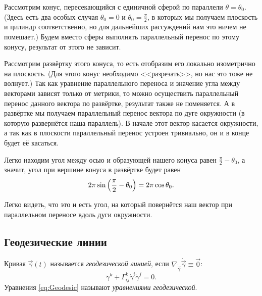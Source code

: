 \begin{secondsolution}
	Рассмотрим конус, пересекающийся с единичной сферой по параллели $\theta = \theta_0$. (Здесь есть два особых случая $\theta_0 = 0$ и $\theta_0 = \frac{\pi}{2}$, в которых мы получаем плоскость и цилиндр соответственно, но для дальнейших рассуждений нам это ничем не помешает.) Будем вместо сферы выполнять параллельный перенос по этому конусу, результат от этого не зависит.

	Рассмотрим развёртку этого конуса, то есть отобразим его локально изометрично на плоскость. (Для этого конус необходимо <<разрезать>>, но нас это тоже не волнует.) Так как уравнение параллельного переноса и значение угла между векторами зависят только от метрики, то можно осуществить параллельный перенос данного вектора по развёртке, результат также не поменяется. А в развёртке мы получаем параллельный перенос вектора по дуге окружности (в которую развернётся наша параллель). В начале этот вектор касается окружности, а так как в плоскости параллельный перенос устроен тривиально, он и в конце будет её касаться.

	Легко находим угол между осью и образующей нашего конуса равен $\frac{\pi}{2} - \theta_0$, а значит, угол при вершине конуса в развёртке будет равен
	\[
		2\pi\sin\left(\frac{\pi}{2} - \theta_0\right) = 2\pi\cos\theta_0.
	\]

	Легко видеть, что это и есть угол, на который повернётся наш вектор при параллельном переносе вдоль дуги окружности.
\end{secondsolution}


\subsection{Геодезические линии}

\begin{definition}
	Кривая $\vec{\gamma}(t)$ называется \textit{геодезической линией}, если $\nabla_{\dot{\vec{\gamma}}}\dot{\vec{\gamma}} \equiv \vec{0}$:
	\begin{equation} \label{eq:Geodesic}
		\ddot{\gamma}^k + \Gamma_{ij}^k\dot{\gamma}^i\dot\gamma^j = 0.
	\end{equation}
	Уравнения \eqref{eq:Geodesic} называют \textit{уравнениями геодезической}.
\end{definition}

